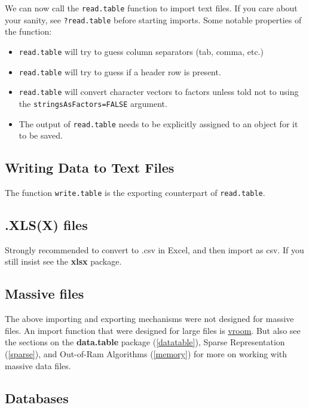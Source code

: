 \documentclass[]{book}
\providecommand{\tightlist}{%
  \setlength{\itemsep}{0pt}\setlength{\parskip}{0pt}}
\theoremstyle{definition}
\theoremstyle{definition}
\theoremstyle{definition}
\theoremstyle{remark}
\begin{document}
We can now call the \texttt{read.table} function to import text files.
If you care about your sanity, see \texttt{?read.table} before starting
imports. Some notable properties of the function:

\begin{itemize}
\tightlist
\item
  \texttt{read.table} will try to guess column separators (tab, comma,
  etc.)
\item
  \texttt{read.table} will try to guess if a header row is present.
\item
  \texttt{read.table} will convert character vectors to factors unless
  told not to using the \texttt{stringsAsFactors=FALSE} argument.
\item
  The output of \texttt{read.table} needs to be explicitly assigned to
  an object for it to be saved.
\end{itemize}

\subsection{Writing Data to Text
Files}\label{writing-data-to-text-files}

The function \texttt{write.table} is the exporting counterpart of
\texttt{read.table}.

\subsection{.XLS(X) files}\label{xlsx-files}

Strongly recommended to convert to .csv in Excel, and then import as
csv. If you still insist see the \textbf{xlsx} package.

\subsection{Massive files}\label{massive-files}

The above importing and exporting mechanisms were not designed for
massive files. An import function that were designed for large files is
\href{https://github.com/r-lib/vroom}{vroom}. But also see the sections
on the \textbf{data.table} package (\ref{datatable}), Sparse
Representation (\ref{sparse}), and Out-of-Ram Algorithms (\ref{memory})
for more on working with massive data files.

\subsection{Databases}\label{databases}
\end{document}
